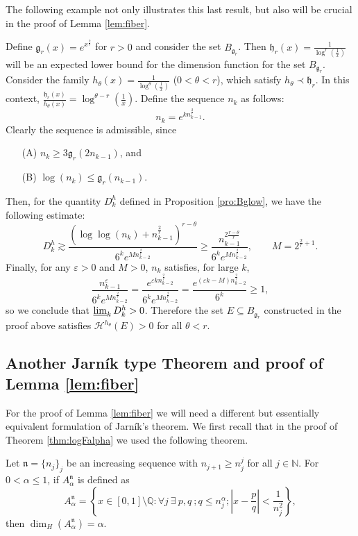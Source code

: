 \documentclass[11pt,a4paper]{amsart}
\begin{document}
The following example not only illustrates this last result, but also will be crucial in the proof of Lemma \ref{lem:fiber}.
\begin{example}\label{ex:loglow}
Define ${\mathfrak{g}}_r(x)=e^{x^\frac{2}{r}}$ for $r>0$ and consider the set $B_{{\mathfrak{g}}_r}$.  Then ${\mathfrak{h}}_r(x)=\frac{1}{\log^r(\frac{1}{x})}$ will be an expected lower bound for the dimension function for the set $B_{{\mathfrak{g}}_r}$. Consider the family $h_\theta(x)=\frac{1}{\log^\theta(\frac{1}{x})}$ ($0<\theta<r$), which satisfy $h_\theta\prec {\mathfrak{h}}_r$. In this context, $\frac{{\mathfrak{h}}_r(x)}{h_\theta(x)} = \log^{\theta-r}(\frac{1}{x})$. Define the sequence $n_k$ as follows:
\[
    n_k=e^{kn^\frac{2}{r}_{k-1}}.
\]
Clearly the sequence is admissible, since
\begin{itemize}
\item[(A)] $n_{k}\ge 3{\mathfrak{g}}_r(2n_{k-1})$, and
\item[(B)] $\log(n_k)\le {\mathfrak{g}}_r(n_{k-1})$.
\end{itemize}
Then, for the quantity $D_k^h$ defined in Proposition \ref{pro:Bglow}, we have the following estimate: 
\begin{equation*}
D_k^h  \gtrsim
\frac{(\log\log(n_k)+n^\frac{2}{r}_{k-1})^{r-\theta}}{6^ke^{Mn^\frac{2}{r}_{k-2}}}
\ge
\frac{n_{k-1}^{2\frac{r-\theta}{r}}}{6^ke^{Mn^\frac{2}{r}_{k-2}}}, \qquad M=2^{\frac{2}{r}+1}.
\end{equation*}
Finally, for any ${\varepsilon}>0$ and  $M>0$, $n_k$ satisfies, for large
$k$,
\[
    \frac{n^{\varepsilon}_{k-1}}{6^ke^{Mn^\frac{2}{r}_{k-2}}}=
    \frac{e^{{\varepsilon}{kn_{k-2}^\frac{2}{r}}}}{6^ke^{Mn_{k-2}^\frac{2}{r}}}
    =\frac{e^{({\varepsilon} k -M)n_{k-2}^\frac{2}{r}}}{6^k}\ge 1,
\]
so we conclude that $\varliminf_k D_k^h>0$. Therefore the set $E{\subseteq} B_{{\mathfrak{g}}_r}$ constructed in the proof above satisfies ${\mathcal{H}^{{h_\theta}}}(E)>0$ for all $\theta<r$.
\end{example}

\subsection{Another Jarn\'ik type Theorem and proof of Lemma \ref{lem:fiber}}

For the proof of Lemma \ref{lem:fiber} we will need a different but essentially equivalent formulation of Jarn\'ik's theorem. We first recall that in the proof of Theorem \ref{thm:logFalpha} we  used the following theorem.
\begin{theorem}\label{thm:jarnikA}
 Let ${\mathfrak{n}}=\{n_j\}_j$ be an increasing sequence with $n_{j+1}\ge n_j^j$ for all $j\in{\mathbb{N}}$. For $0<\alpha\le1$, if $A^{\mathfrak{n}}_\alpha$ is defined as
\[
A^{\mathfrak{n}}_\alpha=\left\{x\in[0,1]\setminus {\mathbb{Q}}: \forall j\ \exists\
p,q\ ; q\le n_j^\alpha; |x-\frac{p}{q}|<\frac{1}{n_j^2}\right\},
\]
then $\dim_H(A^{\mathfrak{n}}_\alpha)=\alpha$.
\end{theorem}
\end{document}
